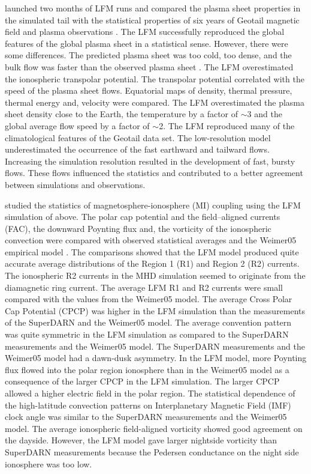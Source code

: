 \documentclass[linenumbers,draft]{agujournal}
\begin{document}
\citet{guild08:_geotail_lfm1,guild08:_geotail_lfm2} launched two months of LFM runs and compared the plasma sheet properties in the simulated tail with the statistical properties of six years of Geotail magnetic field and plasma observations \citep{kokubun94:_geotail_magnet_field_exper,mukai94:_low_energ_partic_lep_exper_geotail_satel}. The LFM successfully reproduced the global features of the global plasma sheet in a statistical sense. However, there were some differences. The predicted plasma sheet was too cold, too dense, and the bulk flow was faster than the observed plasma sheet \citep{kokubun94:_geotail_magnet_field_exper,mukai94:_low_energ_partic_lep_exper_geotail_satel}. The LFM overestimated the ionospheric transpolar potential. The transpolar potential correlated with the speed of the plasma sheet flows. Equatorial maps of density, thermal pressure, thermal energy and, velocity were compared. The LFM overestimated the plasma sheet density close to the Earth, the temperature by a factor of $\sim$3 and the global average flow speed by a factor of $\sim$2. The LFM reproduced many of the climatological features of the Geotail data set. The low-resolution model underestimated the occurrence of the fast earthward and tailward flows. Increasing the simulation resolution resulted in the development of fast, bursty flows. These flows influenced the statistics and contributed to a better agreement between simulations and observations.

\citet{zhang11:_lyon_fedder_mobar_mhd} studied the statistics of magnetosphere-ionosphere (MI) coupling using the LFM simulation of \citet{guild08:_geotail_lfm1} above. The polar cap potential and the field--aligned currents (FAC), the downward Poynting flux and, the vorticity of the ionospheric convection were compared with observed statistical averages and the Weimer05 empirical model \citep{weimer05:_improv_joule}. The comparisons showed that the LFM model produced quite accurate average distributions of the Region 1 (R1) and Region 2 (R2) currents. The ionospheric R2 currents in the MHD simulation seemed to originate from the diamagnetic ring current. The average LFM R1 and R2 currents were small compared with the values from the Weimer05 model. The average Cross Polar Cap Potential (CPCP) was higher in the LFM simulation than the measurements of the SuperDARN and the Weimer05 model. The average convention pattern was quite symmetric in the LFM simulation as compared to the SuperDARN measurements and the Weimer05 model. The SuperDARN measurements and the Weimer05 model had a dawn-dusk asymmetry. In the LFM model, more Poynting flux flowed into the polar region ionosphere than in the Weimer05 model as a consequence of the larger CPCP in the LFM simulation. The larger CPCP allowed a higher electric field in the polar region. The statistical dependence of the high-latitude convection patterns on Interplanetary Magnetic Field (IMF) clock angle was similar to the SuperDARN measurements \citep{sofko95:_direc_super} and the Weimer05 model. The average ionospheric field-aligned vorticity showed good agreement on the dayside. However, the LFM model gave larger nightside vorticity than SuperDARN measurements because the Pedersen conductance on the night side ionosphere was too low. 
\end{document}

